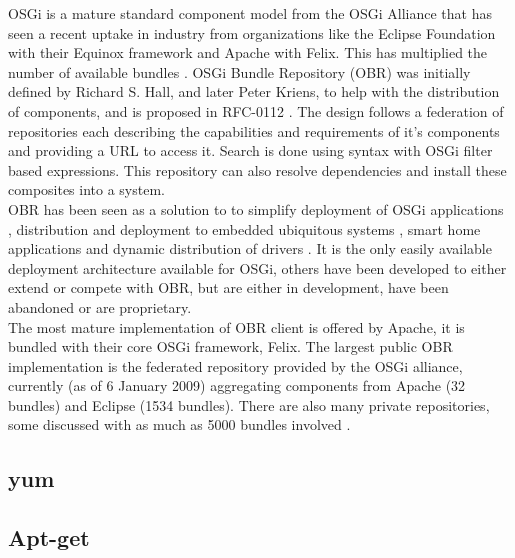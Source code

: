 OSGi is a 
mature standard component model from the OSGi Alliance that has seen a recent uptake in industry \cite{kriens_osgi_2008} 
from organizations like the Eclipse Foundation with their Equinox framework and Apache with Felix. This has multiplied the 
number of available bundles \cite{the_osgi_alliance_rfc-0112_2006}. OSGi Bundle Repository (OBR) was initially defined by 
Richard S. Hall, and later Peter Kriens, to help with the distribution of components, and is proposed in 
RFC-0112 \cite{the_osgi_alliance_rfc-0112_2006}. The design follows a federation of repositories each describing 
the capabilities and requirements of it's components and providing a URL to access it. Search is done using syntax with OSGi filter 
based expressions. This repository can also resolve dependencies and install these composites into a system. \\
OBR has been seen as a solution to to simplify deployment of OSGi applications
\cite{jung_integrating_2007}, distribution and deployment to embedded
ubiquitous systems \cite{jung_embedded_2006}, smart home applications \cite{gouin-vallerand_managing_2007} and 
dynamic distribution of drivers \cite{kriens_osgi_2008}. It is the only easily available deployment 
architecture available for OSGi, others have been developed to either extend or compete \cite{frnot_component_2005} with OBR, 
but are either in development, have been abandoned or are proprietary.\\ 
The most mature implementation of OBR client is offered by Apache, it is bundled with their core OSGi framework, Felix. 
The largest public OBR implementation is the federated repository provided by the OSGi alliance,
currently (as of 6 January 2009) aggregating components from Apache (32 bundles) and Eclipse (1534 bundles).
There are also many private repositories, some discussed with as much as 5000 bundles involved \cite{kriens_osgi_2008}.\\  

\subsection{yum}

\subsection{Apt-get}

